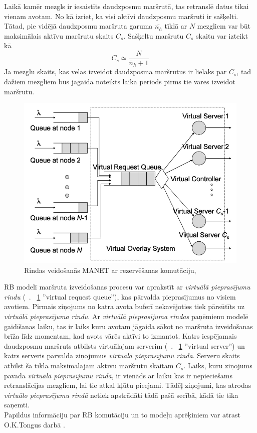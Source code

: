 Laikā kamēr mezgls ir iesaistīts daudzposmu maršrutā, tas retranslē datus tikai vienam avotam. No kā izriet, ka visi aktīvi daudzposmu maršruti ir sašķelti. Tātad, pie vidējā daudzposmu maršruta garuma $\bar{n_{h}}$ tīklā ar $N$ mezgliem var būt maksimālais aktīvu maršrutu skaits $C_{s}$. Sašķeltu maršrutu $C_{s}$ skaitu var izteikt kā \cite{route_res}
\begin{equation}
C_{s}\simeq \frac{N}{\bar{n}_{h}+1}
\end{equation}
Ja mezglu skaits, kas vēlas izveidot daudzposma maršrutus ir lielāks par $C_{s}$, tad dažiem mezgliem būs jāgaida noteikts laika periods pirms tie vārēs izveidot maršrutu.
\begin{figure}[htb!]
\centering
\includegraphics[scale=0.4]{./graph/rb}
\caption{Rindas veidošanās  MANET ar rezervēšanas komutāciju, \cite{route_res}}
\label{fig:rbServer}
\end{figure}

RB modelī maršruta izveidošanas procesu var aprakstīt ar \textit{virtuālā pieprasījumu rindu} (\seename ~\figurename.
~\ref{fig:rbServer} ''virtual request queue''), kas pārvalda pieprasījumus no visiem avotiem. Pirmais ziņojums no katra avota buferī nekavējoties tiek pārsūtīts uz \textit{virtuālā pieprasījuma rindu}. Ar \textit{virtuālā pieprasījuma rindas} paņēmienu modelē gaidīšanas laiku, tas ir laiks kuru avotam jāgaida sākot no maršruta izveidošanas brīža līdz momentam, kad avots vārēs aktīvi to izmantot. Katrs iespējamais daudzposmu maršruts atbilsts virtuālajam serverim (\seename ~\figurename. ~\ref{fig:rbServer} ''virtual server'') un katrs serveris pārvalda ziņojumus \textit{virtuālā pieprasījumu rindā}. Serveru skaits atbilst šā tīkla maksimālajam aktīvu maršrutu skaitam $C_{s}$. Laiks, kuru ziņojums pavada \textit{virtuālā pieprasījumu rindā}, ir vienāds ar laiku kas ir nepieciešams retranslācijas mezgliem, lai tie atkal kļūtu pieejami. Tādēļ ziņojumi, kas atrodas \textit{virtuālo pieprasījumu rindā} netiek apstrādāti tādā pašā secībā, kādā tie tika saņemti.\\
Papildus informāciju par RB komutāciju un to modeļu aprēķiniem var atrast O.K.Tongus darbā  \cite{route_res}.


